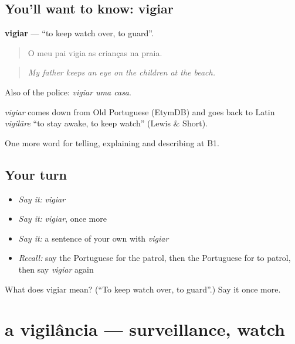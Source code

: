 \subsection*{You'll want to know: vigiar}
\textbf{vigiar} — \textquotedblleft{}to keep watch over, to guard\textquotedblright{}.

\begin{quote}
O meu pai vigia as crianças na praia.
\end{quote}

\begin{quote}
\emph{My father keeps an eye on the children at the beach.}
\end{quote}

Also of the police: \emph{vigiar uma casa}.

\begin{cousinweb}
\emph{vigiar} comes down from Old Portuguese (EtymDB) and goes back to Latin \emph{vigilāre} \textquotedblleft{}to stay awake, to keep watch\textquotedblright{} (Lewis \& Short).
\end{cousinweb}

\begin{grammarlens}[title={What you've built}]
One more word for telling, explaining and describing at B1.
\end{grammarlens}

\subsection*{Your turn}
\begin{itemize}
\raggedright
  \item \emph{Say it:} \emph{vigiar}
  \item \emph{Say it:} \emph{vigiar}, once more
  \item \emph{Say it:} a sentence of your own with \emph{vigiar}
  \item \emph{Recall:} say the Portuguese for the patrol, then the Portuguese for to patrol, then say \emph{vigiar} again
\end{itemize}

\begin{tcolorbox}[breakable,colback=teal!4,colframe=teal!35!black,title={Before you move on}]
What does vigiar mean? (\textquotedblleft{}To keep watch over, to guard\textquotedblright{}.) Say it once more.
\end{tcolorbox}
\section[a vigilância]{a vigilância — surveillance, watch}

